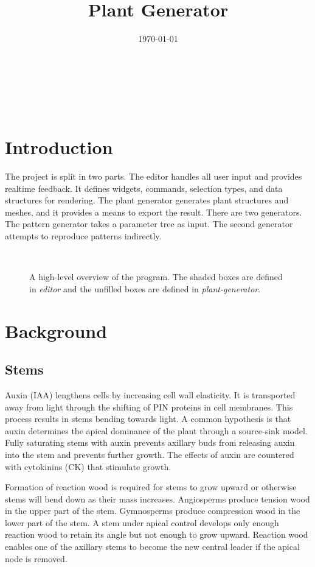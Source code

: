 \documentclass[10pt]{article}
\title{Plant Generator}
\date{\today}
\begin{document}
\begin{center}
  \\
 \vspace{1em}
 \begin{huge} \@title \end{huge} \\
 \vspace{1em}
 \@date
\end{center}
\tableofcontents
\pagebreak

\section{Introduction}
The project is split in two parts. The editor handles all user input and provides realtime feedback. It defines widgets, commands, selection types, and data structures for rendering. The plant generator generates plant structures and meshes, and it provides a means to export the result. There are two generators. The pattern generator takes a parameter tree as input. The second generator attempts to reproduce patterns indirectly.
\begin{figure}[H]
\centering
 \\
\caption{A high-level overview of the program. The shaded boxes are defined in \textit{editor} and the unfilled boxes are defined in \textit{plant-generator}.}
\end{figure}

\newpage
\section{Background}
\subsection{Stems}
Auxin (IAA) lengthens cells by increasing cell wall elasticity. It is transported away from light through the shifting of PIN proteins in cell membranes. This process results in stems bending towards light. A common hypothesis is that auxin determines the apical dominance of the plant through a source-sink model. Fully saturating stems with auxin prevents axillary buds from releasing auxin into the stem and prevents further growth. The effects of auxin are countered with cytokinins (CK) that stimulate growth.

Formation of reaction wood is required for stems to grow upward or otherwise stems will bend down as their mass increases. Angiosperms produce tension wood in the upper part of the stem. Gymnosperms produce compression wood in the lower part of the stem. A stem under apical control develops only enough reaction wood to retain its angle but not enough to grow upward. Reaction wood enables one of the axillary stems to become the new central leader if the apical node is removed.
\end{document}
